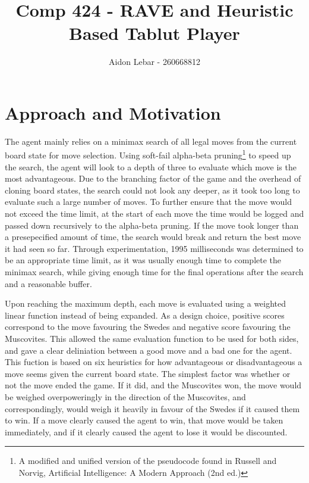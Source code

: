 \documentclass[11 pt, letter paper]{article}
\title{Comp 424 - RAVE and Heuristic Based Tablut Player}
\author{Aidon Lebar - 260668812}
\begin{document}
    \maketitle
    \section{Approach and Motivation}
        The agent mainly relies on a minimax search of all legal moves from the current board state for move selection.
        Using soft-fail alpha-beta pruning\footnote{A modified and unified version of the pseudocode found in Russell and Norvig, Artificial Intelligence: A Modern Approach (2nd ed.)}
        to speed up the search, the agent will look to a depth of three to evaluate which move is the most advantageous.
        Due to the branching factor of the game and the overhead of cloning board states,
        the search could not look any deeper, as it took too long to evaluate such a large number of moves.
        To further ensure that the move would not exceed the time limit, at the start of each move the time would be logged and passed down recursively to the alpha-beta pruning.
        If the move took longer than a presepecified amount of time, the search would break and return the best move it had seen so far.
        Through experimentation, 1995 milliseconds was determined to be an appropriate time limit,
        as it was usually enough time to complete the minimax search, while giving enough time for the final operations after the search and a reasonable buffer.

        Upon reaching the maximum depth, each move is evaluated using a weighted linear function instead of being expanded.
        As a design choice, positive scores correspond to the move favouring the Swedes and negative score favouring the Muscovites.
        This allowed the same evaluation function to be used for both sides, and gave a clear deliniation between a good move and a bad one for the agent.
        This fuction is based on six heuristics for how advantageous or disadvantageous a move seems given the current board state.
        The simplest factor was whether or not the move ended the game. If it did, and the Muscovites won, the move would be weighed overpoweringly
        in the direction of the Muscovites, and correspondingly, would weigh it heavily in favour of the Swedes if it caused them to win.
        If a move clearly caused the agent to win, that move would be taken immediately, and if it clearly caused the agent to lose it would be discounted.
\end{document}
